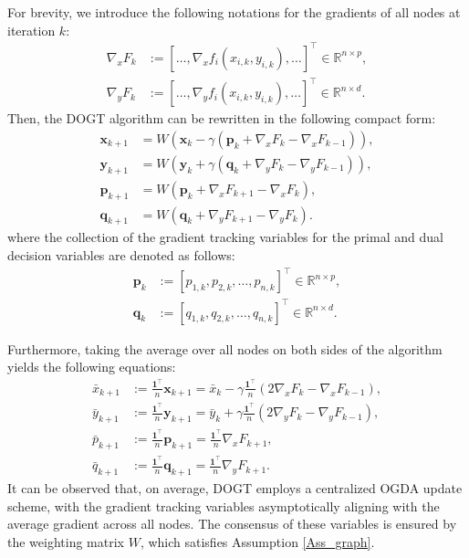 \documentclass[10pt,a4paper]{amsart}
\begin{document}
For brevity, we introduce the following notations for the gradients of all nodes at iteration $k$:
\begin{equation*}
\begin{aligned}
\nabla _xF_k&:=\left[ \dots ,\nabla _xf_i\left( x_{i,k},y_{i,k} \right) ,\dots \right] ^{\top} \in \mathbb{R} ^{n\times p},
\\
\nabla _yF_k&:=\left[ \dots ,\nabla _yf_i\left( x_{i,k},y_{i,k} \right) ,\dots \right] ^{\top} \in \mathbb{R} ^{n\times d}.
\end{aligned}
\end{equation*}
Then, the DOGT algorithm can be rewritten in the following compact form:
\begin{equation}\label{Eq_DOGT}
\begin{aligned}
\mathbf{x}_{k+1}&=W\left( \mathbf{x}_k-\gamma \left( \mathbf{p}_k+\nabla _xF_k-\nabla _xF_{k-1} \right) \right),
\\
\mathbf{y}_{k+1}&=W\left( \mathbf{y}_k+\gamma \left( \mathbf{q}_k+\nabla _yF_k-\nabla _yF_{k-1} \right) \right),
\\
\mathbf{p}_{k+1}&=W\left( \mathbf{p}_k+\nabla _xF_{k+1}-\nabla _xF_k \right) ,
\\
\mathbf{q}_{k+1}&=W\left( \mathbf{q}_k+\nabla _yF_{k+1}-\nabla _yF_k \right) .
\end{aligned}
\end{equation}
where the collection of the gradient tracking variables for the primal and dual decision variables are denoted as follows:
\begin{equation*}
\begin{aligned}
\mathbf{p}_k&:=\left[ p_{1,k},p_{2,k},\dots ,p_{n,k} \right] ^{\top}\in \mathbb{R} ^{n\times p},
\\
\mathbf{q}_k&:=\left[ q_{1,k},q_{2,k},\dots ,q_{n,k} \right] ^{\top}\in \mathbb{R} ^{n\times d}.
\end{aligned}
\end{equation*}


Furthermore, taking the average over all nodes on both sides of the algorithm yields the following equations:
\begin{equation}
\begin{aligned}
\bar{x}_{k+1}&:=\frac{\mathbf{1}^{\top}}{n}\mathbf{x}_{k+1}=\bar{x}_k-\gamma \frac{\mathbf{1}^{\top}}{n}\left( 2\nabla _xF_k-\nabla _xF_{k-1} \right) ,
\\
\bar{y}_{k+1}&:=\frac{\mathbf{1}^{\top}}{n}\mathbf{y}_{k+1}=\bar{y}_k+\gamma \frac{\mathbf{1}^{\top}}{n}\left( 2\nabla _yF_k-\nabla _yF_{k-1} \right),
\\
\bar{p}_{k+1}&:=\frac{\mathbf{1}^{\top}}{n}\mathbf{p}_{k+1}=\frac{\mathbf{1}^{\top}}{n}\nabla _xF_{k+1},
\\
\bar{q}_{k+1}&:=\frac{\mathbf{1}^{\top}}{n}\mathbf{q}_{k+1}=\frac{\mathbf{1}^{\top}}{n}\nabla _yF_{k+1}.
\end{aligned}
\end{equation}
It can be observed that, on average, DOGT employs a centralized OGDA update scheme, with the gradient tracking variables asymptotically aligning with the average gradient across all nodes. The consensus of these variables is ensured by the weighting matrix $W$, which satisfies Assumption \ref{Ass_graph}.
\end{document}
